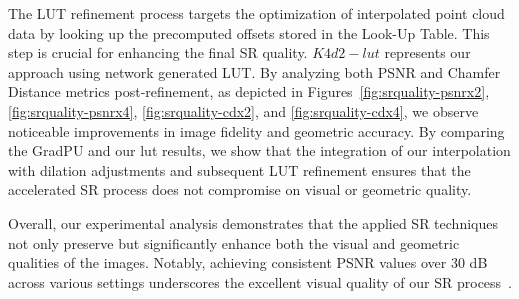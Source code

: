 \label{sec:eval-srqual}

The LUT refinement process targets the optimization of interpolated point cloud data by looking up the precomputed offsets stored in the Look-Up Table. This step is crucial for enhancing the final SR quality. $K4d2-lut$ represents our approach using network generated LUT.  By analyzing both PSNR and Chamfer Distance metrics post-refinement, as depicted in Figures~\ref{fig:srquality-psnrx2}, \ref{fig:srquality-psnrx4}, \ref{fig:srquality-cdx2}, and \ref{fig:srquality-cdx4}, we observe noticeable improvements in image fidelity and geometric accuracy. By comparing the GradPU and our lut results, we show that the integration of our interpolation with dilation adjustments and subsequent LUT refinement ensures that the accelerated SR process does not compromise on visual or geometric quality. 

Overall, our experimental analysis demonstrates that the applied SR techniques not only preserve but significantly enhance both the visual and geometric qualities of the images. Notably, achieving consistent PSNR values over 30 dB across various settings underscores the excellent visual quality of our SR process~\cite{thomos2005optimized,dasari2020streaming}.



\label{sec:eval-runtime}




